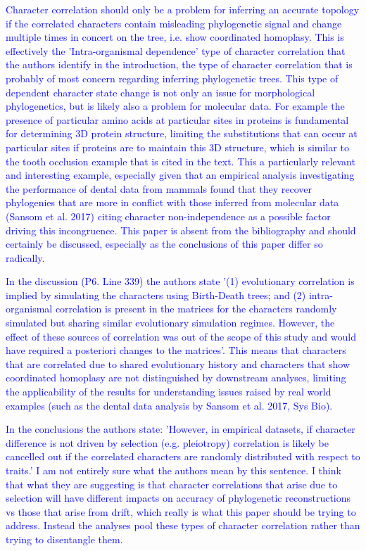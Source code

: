\documentclass[12pt,letterpaper]{article}
\begin{document}
\textcolor{blue}{Character correlation should only be a problem for inferring an accurate topology if the correlated characters contain misleading phylogenetic signal and change multiple times in concert on the tree, i.e. show coordinated homoplasy.  This is effectively the 'Intra-organismal dependence' type of character correlation that the authors identify in the introduction, the type of character correlation that is probably of most concern regarding inferring phylogenetic trees. This type of dependent character state change is not only an issue for morphological phylogenetics, but is likely also a problem for molecular data. For example the presence of particular amino acids at particular sites in proteins is fundamental for determining 3D protein structure, limiting the substitutions that can occur at particular sites if proteins are to maintain this 3D structure, which is similar to the tooth occlusion example that is cited in the text. This a particularly relevant and interesting example, especially given that an empirical analysis investigating the performance of dental data from mammals found that they recover phylogenies that are more in conflict with those inferred from molecular data (Sansom et al. 2017) citing character non-independence as a possible factor driving this incongruence. This paper is absent from the bibliography and should certainly be discussed, especially as the conclusions of this paper differ so radically.}

\textcolor{blue}{In the discussion (P6. Line 339) the authors state '(1) evolutionary correlation is implied by simulating the characters using Birth-Death trees; and (2) intra-organismal correlation is present in the matrices for the characters randomly simulated but sharing similar evolutionary simulation regimes.  However, the effect of these sources of correlation was out of the scope of this study and would have required a posteriori changes to the matrices'. This means that characters that are correlated due to shared evolutionary history and characters that show coordinated homoplasy are not distinguished by downstream analyses, limiting the applicability of the results for understanding issues raised by real world examples (such as the dental data analysis by Sansom et al. 2017, Sys Bio).}

\textcolor{blue}{In the conclusions the authors state: 'However, in empirical datasets, if character difference is not driven by selection (e.g. pleiotropy) correlation is likely be cancelled out if the correlated characters are randomly distributed with respect to traits.' I am not entirely sure what the authors mean by this sentence. I think that what they are suggesting is that character correlations that arise due to selection will have different impacts on accuracy of phylogenetic reconstructions vs those that arise from drift, which really is what this paper should be trying to address. Instead the analyses pool these types of character correlation rather than trying to disentangle them.}
\end{document}
